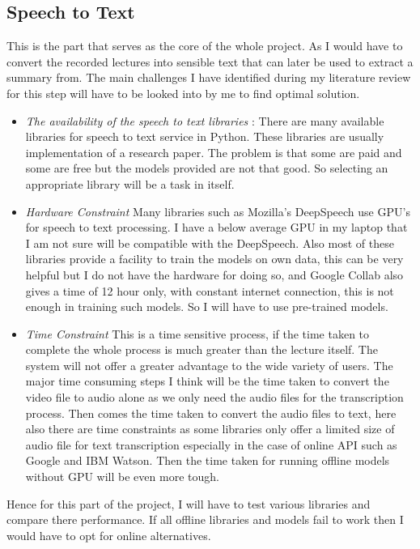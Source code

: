\documentclass[11pt,a4paper]{article}
\begin{document}
	\subsection{Speech to Text}
	This is the part that serves as the core of the whole project. As I would have to convert the recorded lectures into sensible text that can later be used to extract a summary from. The main challenges I have identified during my literature review for this step will have to be looked into by me to find optimal solution.
	\begin{itemize}
		\item \textit{The availability of the speech to text libraries }: There are many available libraries for speech to text service in Python. These libraries are usually implementation of a research paper. The problem is that some are paid and some are free but the models provided are not that good. So selecting an appropriate library will be a task in itself.
		\item \textit{Hardware Constraint} Many libraries such as Mozilla's DeepSpeech \citep{deepspeech-mozilla} use GPU's for speech to text processing. I have a below average GPU in my laptop that I am not sure will be compatible with the DeepSpeech. Also most of these libraries provide a facility to train the models on own data, this can be very helpful but I do not have the hardware for doing so, and Google Collab also gives a time of 12 hour only, with constant internet connection, this is not enough in training such models. So I will have to use pre-trained models.
		\item \textit{Time Constraint} This is a time sensitive process, if the time taken to complete the whole process is much greater than the lecture itself. The system will not offer a greater advantage to the wide variety of users. The major time consuming steps I think will be the time taken to convert the video file to audio alone as we only need the audio files for the transcription process. Then comes the time taken to convert the audio files to text, here also there are time constraints as some libraries only offer a limited size of audio file for  text transcription especially in the case of online API such as Google and IBM Watson. Then the time taken for running offline models without GPU will be even more tough. 
		\end{itemize}
	Hence for this part of the project, I will have to test various libraries and compare there performance. If all offline libraries and models fail to work then I would have to opt for online alternatives. 
\end{document}

